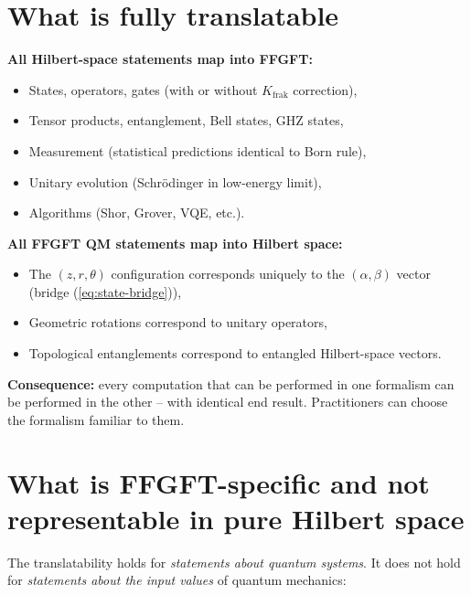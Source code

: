 \section{What is fully translatable}

\textbf{All Hilbert-space statements map into FFGFT:}
\begin{itemize}[leftmargin=2em,itemsep=2pt,topsep=2pt]
  \item States, operators, gates (with or without $K_{\text{frak}}$ correction),
  \item Tensor products, entanglement, Bell states, GHZ states,
  \item Measurement (statistical predictions identical to Born rule),
  \item Unitary evolution (Schrödinger in low-energy limit),
  \item Algorithms (Shor, Grover, VQE, etc.).
\end{itemize}

\textbf{All FFGFT QM statements map into Hilbert space:}
\begin{itemize}[leftmargin=2em,itemsep=2pt,topsep=2pt]
  \item The $(z, r, \theta)$ configuration corresponds uniquely to
        the $(\alpha, \beta)$ vector (bridge (\ref{eq:state-bridge})),
  \item Geometric rotations correspond to unitary operators,
  \item Topological entanglements correspond to entangled
        Hilbert-space vectors.
\end{itemize}

\textbf{Consequence:} every computation that can be performed in one
formalism can be performed in the other -- with identical end
result. Practitioners can choose the formalism familiar to them.

\section{What is FFGFT-specific and not representable in pure Hilbert space}

The translatability holds for \emph{statements about quantum systems}.
It does not hold for \emph{statements about the input values} of
quantum mechanics:

